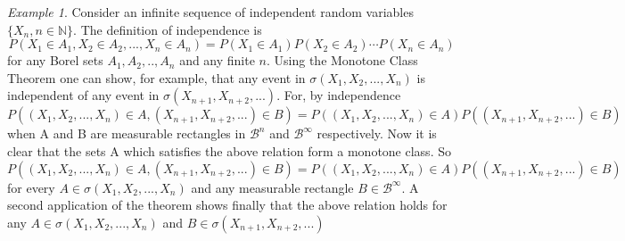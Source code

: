 \documentclass[12pt]{article}
\theoremstyle{remark}
\newtheorem{exmpl}{Example}
\numberwithin{equation}{section}
\begin{document}
\begin{exmpl}
Consider an infinite sequence of independent random variables
$\{X_n, n \in \mathbb N\}$. The definition of independence is
$$P(X_1 \in A_1, X_2 \in A_2,...,X_n \in A_n)=P(X_1 \in A_1)P(X_2 \in A_2)\cdots P(X_n
\in A_n)$$ for any Borel sets $A_1, A_2,.., A_n$ and any finite $n$.
Using the Monotone Class Theorem one can show, for example, that any
event in $\sigma(X_1,X_2,...,X_n)$ is independent of any event in
$\sigma(X_{n+1},X_{n+2},...)$. For, by independence
$$P((X_1,X_2,...,X_n)\in A, (X_{n+1},X_{n+2},...)\in B)=P((X_1,X_2,...,X_n)\in A)P((X_{n+1},X_{n+2},...)\in B)$$
when A and
B are measurable rectangles in $\mathcal B^n$ and $\mathcal
B^{\infty}$ respectively. Now it is clear that the sets A which
satisfies the above relation form a monotone class. So
$$P((X_1,X_2,...,X_n)\in A, (X_{n+1},X_{n+2},...)\in B)=P((X_1,X_2,...,X_n)\in A)P((X_{n+1},X_{n+2},...)\in B)$$
for every $A \in \sigma(X_1,X_2,...,X_n)$ and any measurable
rectangle $B \in \mathcal B^{\infty}$. A second application of the
theorem shows finally that the above relation holds for any $A \in
\sigma(X_1,X_2,...,X_n)$ and $B \in \sigma(X_{n+1},X_{n+2},...)$


\end{exmpl}
\end{document}
